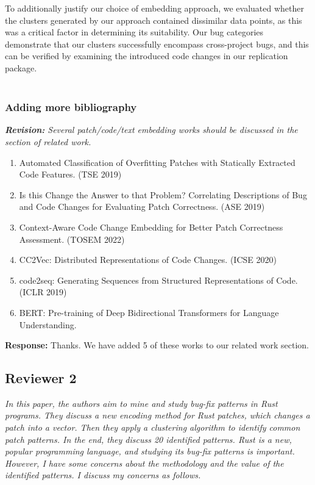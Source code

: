 \documentclass{article}
\begin{document}
To additionally justify our choice of embedding approach, we evaluated whether the clusters generated by our approach contained dissimilar data points, as this was a critical factor in determining its suitability. Our bug categories demonstrate that our clusters successfully encompass cross-project bugs, and this can be verified by examining the introduced code changes in our replication package. \\ \\

\subsubsection{\label{rev:1:bib}Adding more bibliography}

\textit{\textbf{Revision:} Several patch/code/text embedding works should be discussed in the section of related work.}
\begin{enumerate}
    \item Automated Classification of Overfitting Patches with Statically Extracted Code Features. (TSE 2019)
    \item Is this Change the Answer to that Problem? Correlating Descriptions of Bug and Code Changes for Evaluating Patch Correctness. (ASE 2019)
    \item Context-Aware Code Change Embedding for Better Patch Correctness Assessment. (TOSEM 2022)
    \item CC2Vec: Distributed Representations of Code Changes. (ICSE 2020)
    \item code2seq: Generating Sequences from Structured Representations of Code. (ICLR 2019)
    \item BERT: Pre-training of Deep Bidirectional Transformers for Language Understanding.
\end{enumerate}


\textbf{Response:} Thanks. We have added 5 of these works to our related work section.

\subsection{Reviewer 2}

\textit{In this paper, the authors aim to mine and study bug-fix patterns in Rust programs. They discuss a new encoding method for Rust patches, which changes a patch into a vector. Then they apply a clustering algorithm to identify common patch patterns. In the end, they discuss 20 identified patterns.
Rust is a new, popular programming language, and studying its bug-fix patterns is important. However, I have some concerns about the methodology and the value of the identified patterns. I discuss my concerns as follows.} \\ \\
\end{document}
